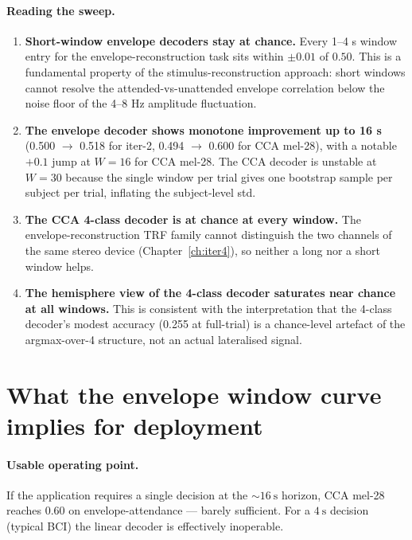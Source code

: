 \paragraph{Reading the sweep.}
\begin{enumerate}
  \item \textbf{Short-window envelope decoders stay at chance.} Every
        1--4 s window entry for the envelope-reconstruction task sits
        within $\pm 0.01$ of $0.50$. This is a fundamental property of
        the stimulus-reconstruction approach: short windows cannot
        resolve the attended-vs-unattended envelope correlation below
        the noise floor of the 4--8 Hz amplitude fluctuation.
  \item \textbf{The envelope decoder shows monotone improvement up to
        16 s} (0.500 $\to$ 0.518 for iter-2, 0.494 $\to$ 0.600 for
        CCA mel-28), with a notable $+0.1$ jump at $W=16$ for
        CCA mel-28. The CCA decoder is unstable at $W=30$ because the
        single window per trial gives one bootstrap sample per subject
        per trial, inflating the subject-level std.
  \item \textbf{The CCA 4-class decoder is at chance at every window.}
        The envelope-reconstruction TRF family cannot distinguish the
        two channels of the same stereo device (Chapter~\ref{ch:iter4}),
        so neither a long nor a short window helps.
  \item \textbf{The hemisphere view of the 4-class decoder saturates
        near chance at all windows.} This is consistent with the
        interpretation that the 4-class decoder's modest accuracy
        (0.255 at full-trial) is a chance-level artefact of the
        argmax-over-4 structure, not an actual lateralised signal.
\end{enumerate}

\section{What the envelope window curve implies for deployment}

\paragraph{Usable operating point.} If the application requires a single
decision at the $\sim \SI{16}{\second}$ horizon, CCA mel-28 reaches
$0.60$ on envelope-attendance --- barely sufficient. For a
$\SI{4}{\second}$ decision (typical BCI) the linear decoder is
effectively inoperable.


